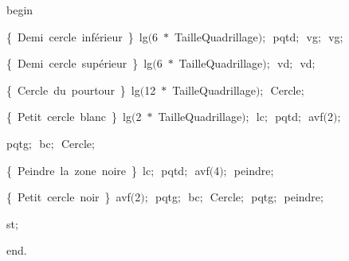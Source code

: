 {\vspace{\neglskip}\mbox{\blc  \idt  \mcl begin\idt }\par 
\vspace{\neglskip}\mbox{\blc  \blk\idt  \cmt  \{\ Demi\ cercle\ inférieur\ \}\idt \ lg$($6\ $\ast$\ TailleQuadrillage$)$$;$\ pqtd$;$\ vg$;$\ vg$;$}\par 
\vspace{\neglskip}\mbox{\blc  \blk\idt  \cmt  \{\ Demi\ cercle\ supérieur\ \}\idt \ lg$($6\ $\ast$\ TailleQuadrillage$)$$;$\ vd$;$\ vd$;$\ }\par 
\vspace{\neglskip}\mbox{\blc  \blk\idt  \cmt  \{\ Cercle\ du\ pourtour\ \}\idt \ lg$($12\ $\ast$\ TailleQuadrillage$)$$;$\ Cercle$;$}\par 
\vspace{\neglskip}\mbox{\blc  \blk\idt  \cmt  \{\ Petit\ cercle\ blanc\ \}\idt \ lg$($2\ $\ast$\ TailleQuadrillage$)$$;$\ lc$;$\ pqtd$;$\ avf$($2$)$$;$}\par 
\vspace{\neglskip}\mbox{\blc  \blk\idt  pqtg$;$\ bc$;$\ Cercle$;$}\par 
\vspace{\neglskip}\mbox{\blc  \blk\idt  \cmt  \{\ Peindre\ la\ zone\ noire\ \}\idt \ lc$;$\ pqtd$;$\ avf$($4$)$$;$\ peindre$;$}\par 
\vspace{\neglskip}\mbox{\blc  \blk\idt  \cmt  \{\ Petit\ cercle\ noir\ \}\idt \ avf$($2$)$$;$\ pqtg$;$\ bc$;$\ Cercle$;$\ pqtg$;$\ peindre$;$}\par 
\vspace{\neglskip}\mbox{\blc  \blk\idt  st$;$\ }\par 
\vspace{\neglskip}\mbox{\blc  \idt  \mcl end\idt $.$}\par 

\medskip }

